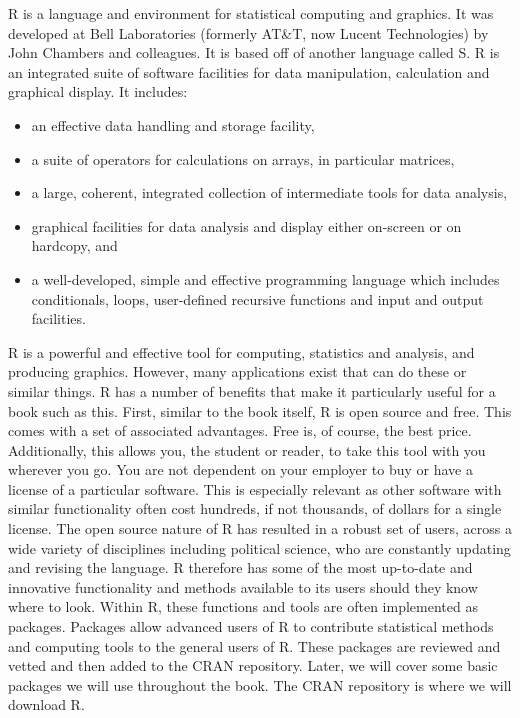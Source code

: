 \documentclass[11pt,openany]{book}\usepackage[]{graphicx}\usepackage[]{color}
\begin{document}
{R is a language and environment for statistical computing and graphics. It was developed at Bell Laboratories (formerly AT\&T, now Lucent Technologies) by John Chambers and colleagues. It is based off of another language called S. R is an integrated suite of software facilities for data manipulation, calculation and graphical display. It includes:
\begin{itemize}
\item an effective data handling and storage facility,
\item a suite of operators for calculations on arrays, in particular matrices,
\item a large, coherent, integrated collection of intermediate tools for data analysis,
\item graphical facilities for data analysis and display either on-screen or on hardcopy, and
\item a well-developed, simple and effective programming language which includes conditionals, loops, user-defined recursive functions and input and output facilities.
\end{itemize}

R is a powerful and effective tool for computing, statistics and analysis, and producing graphics. However, many applications exist that can do these or similar things. R has a number of benefits that make it particularly useful for a book such as this. First, similar to the book itself, R is open source and free. This comes with a set of associated advantages. Free is, of course, the best price. Additionally, this allows you, the student or reader, to take this tool with you wherever you go. You are not dependent on your employer to buy or have a license of a particular software. This is especially relevant as other software with similar functionality often cost hundreds, if not thousands, of dollars for a single license. The open source nature of R has resulted in a robust set of users, across a wide variety of disciplines including political science, who are constantly updating and revising the language. R therefore has some of the most up-to-date and innovative functionality and methods available to its users should they know where to look. Within R, these functions and tools are often implemented as packages. Packages allow advanced users of R to contribute statistical methods and computing tools to the general users of R. These packages are reviewed and vetted and then added to the CRAN repository. Later, we will cover some basic packages we will use throughout the book. The CRAN repository is where we will download R.

}
\end{document}
